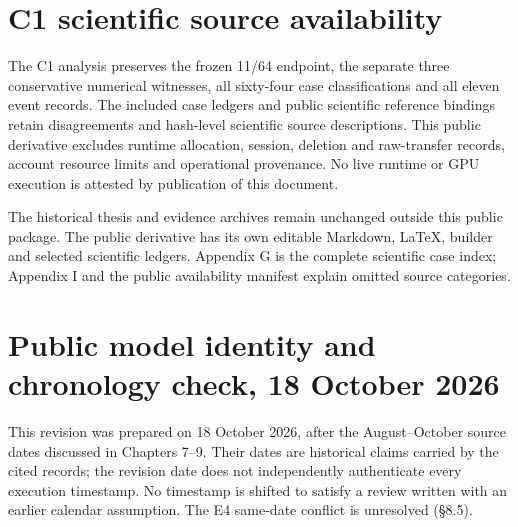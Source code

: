 \documentclass[12pt,a4paper]{report}
\begin{document}
\section{C1 scientific source
availability}\label{c1-scientific-source-availability}

The C1 analysis preserves the frozen 11/64 endpoint, the separate three
conservative numerical witnesses, all sixty-four case classifications
and all eleven event records. The included case ledgers and public
scientific reference bindings retain disagreements and hash-level
scientific source descriptions. This public derivative excludes runtime
allocation, session, deletion and raw-transfer records, account resource
limits and operational provenance. No live runtime or GPU execution is
attested by publication of this document.

The historical thesis and evidence archives remain unchanged outside
this public package. The public derivative has its own editable
Markdown, LaTeX, builder and selected scientific ledgers. Appendix G is
the complete scientific case index; Appendix I and the public
availability manifest explain omitted source categories.

\section{Public model identity and chronology check, 18 October
2026}\label{public-model-identity-and-chronology-check-18-october-2026}

This revision was prepared on 18 October 2026, after the August--October
source dates discussed in Chapters 7--9. Their dates are historical
claims carried by the cited records; the revision date does not
independently authenticate every execution timestamp. No timestamp is
shifted to satisfy a review written with an earlier calendar assumption.
The E4 same-date conflict is unresolved (§8.5).
\end{document}

